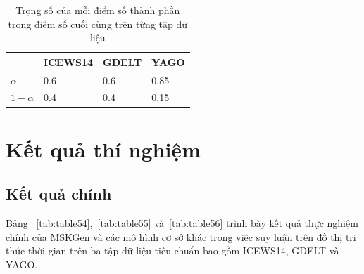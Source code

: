 \begin{table}[H]
\caption{Trọng số của mỗi điểm số thành phần trong điểm số cuối cùng trên từng tập dữ liệu}
\label{tab:table53}
\begin{adjustbox}{width=\textwidth}
\begin{tabular}{|l|l|l|l|}
\hline
           & ICEWS14 & GDELT & YAGO \\ \hline
$\alpha$   & 0.6     & 0.6   & 0.85 \\ \hline
$1-\alpha$ & 0.4     & 0.4   & 0.15 \\ \hline
\end{tabular}
\end{adjustbox}  
\end{table}
  

\section{Kết quả thí nghiệm}
\subsection{Kết quả chính}

Bảng ~\ref{tab:table54},~\ref{tab:table55} và~\ref{tab:table56} trình bày kết quả thực nghiệm chính của MSKGen và 
các mô hình cơ sở khác trong việc suy luận trên đồ thị tri thức thời gian trên ba tập dữ liệu tiêu chuẩn bao gồm 
ICEWS14, GDELT và YAGO.

